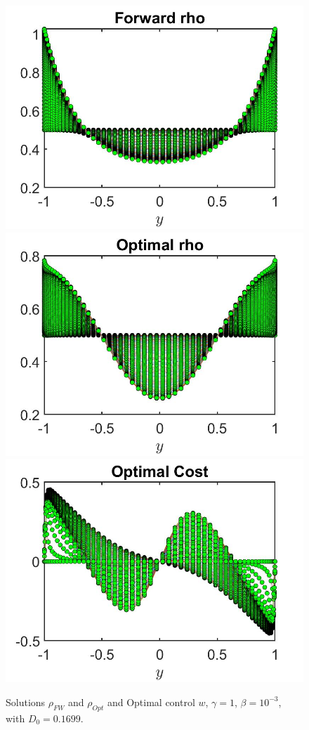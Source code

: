 \documentclass[11pt, a4paper]{article}
\theoremstyle{definition}
\begin{document}
\begin{figure}[h]
	\includegraphics[scale=0.3]{rhoFWDiv1.jpg}	\includegraphics[scale=0.3]{rhoOptDiv1.jpg}
	\includegraphics[scale=0.3]{wOptDiv1.jpg}
	\caption{Solutions $\rho_{FW}$ and $\rho_{Opt}$ and Optimal control $w$, $\gamma = 1$, $\beta = 10^{-3}$, with $D_0 = 0.1699$.}
	\label{rhoDiv1}
\end{figure}
	
\end{document}

